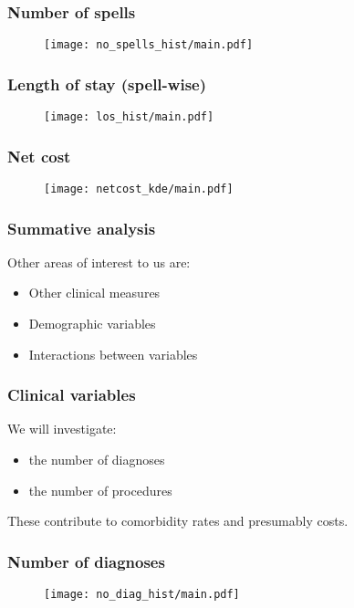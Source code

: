 \begin{frame}
    \frametitle{Number of spells}

    \begin{figure}
    \texttt{[image: no\_spells\_hist/main.pdf]}
    \end{figure}
\end{frame}

\begin{frame}
    \frametitle{Length of stay (spell-wise)}

    \begin{figure}
    \texttt{[image: los\_hist/main.pdf]}
    \end{figure}
\end{frame}

\begin{frame}
    \frametitle{Net cost}

    \begin{figure}
    \texttt{[image: netcost\_kde/main.pdf]}
    \end{figure}
\end{frame}

\begin{frame}
    \frametitle{Summative analysis}
    Other areas of interest to us are:
    \begin{itemize}
        \item Other clinical measures
        \item Demographic variables
        \item Interactions between variables
    \end{itemize}
\end{frame}

\begin{frame}
    \frametitle{Clinical variables}

    We will investigate:
    \begin{itemize}
        \item the number of diagnoses
        \item the number of procedures
    \end{itemize}

    \pause%
    These contribute to comorbidity rates and presumably costs.
\end{frame}

\begin{frame}
    \frametitle{Number of diagnoses}

    \begin{figure}
    \texttt{[image: no\_diag\_hist/main.pdf]}
    \end{figure}
\end{frame}

